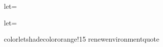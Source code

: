 \usepackage{framed}
\usepackage{xcolor}
\let\oldquote=\quote
\let\endoldquote=\endquote
{}
\renewenvironment{quote}{\begin{shaded*}\begin{oldquote}}{\end{oldquote}\end{shaded*}}let\oldquote=\quote
let\endoldquote=\endquote
colorlet{shadecolor}{orange!15}
renewenvironment{quote}{\begin{shaded*}\begin{oldquote}}{\end{oldquote}\end{shaded*}}
